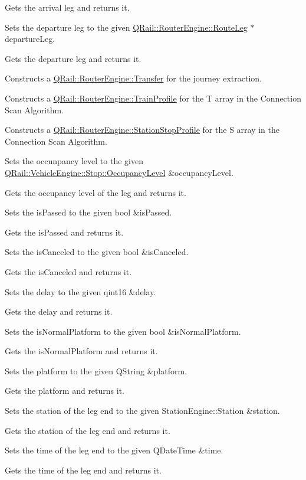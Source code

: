 Gets the arrival leg and returns it.

Sets the departure leg to the given \mbox{\hyperlink{classQRail_1_1RouterEngine_1_1RouteLeg}{Q\+Rail\+::\+Router\+Engine\+::\+Route\+Leg}} $\ast$departure\+Leg.

Gets the departure leg and returns it.

Constructs a \mbox{\hyperlink{classQRail_1_1RouterEngine_1_1Transfer}{Q\+Rail\+::\+Router\+Engine\+::\+Transfer}} for the journey extraction.

Constructs a \mbox{\hyperlink{classQRail_1_1RouterEngine_1_1TrainProfile}{Q\+Rail\+::\+Router\+Engine\+::\+Train\+Profile}} for the T array in the Connection Scan Algorithm.

Constructs a \mbox{\hyperlink{classQRail_1_1RouterEngine_1_1StationStopProfile}{Q\+Rail\+::\+Router\+Engine\+::\+Station\+Stop\+Profile}} for the S array in the Connection Scan Algorithm.

Sets the occunpancy level to the given \mbox{\hyperlink{classQRail_1_1VehicleEngine_1_1Stop_ad967ed81b19762bd582c1af07354a6d4}{Q\+Rail\+::\+Vehicle\+Engine\+::\+Stop\+::\+Occupancy\+Level}} \&occupancy\+Level.

Gets the occupancy level of the leg and returns it.

Sets the is\+Passed to the given bool \&is\+Passed.

Gets the is\+Passed and returns it.

Sets the is\+Canceled to the given bool \&is\+Canceled.

Gets the is\+Canceled and returns it.

Sets the delay to the given qint16 \&delay.

Gets the delay and returns it.

Sets the is\+Normal\+Platform to the given bool \&is\+Normal\+Platform.

Gets the is\+Normal\+Platform and returns it.

Sets the platform to the given Q\+String \&platform.

Gets the platform and returns it.

Sets the station of the leg end to the given Station\+Engine\+::\+Station \&station.

Gets the station of the leg end and returns it.

Sets the time of the leg end to the given Q\+Date\+Time \&time.

Gets the time of the leg end and returns it.

